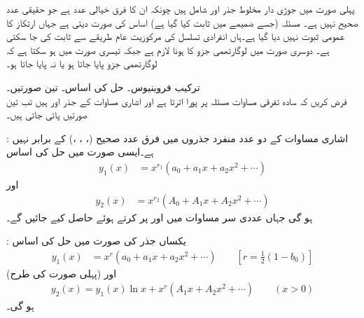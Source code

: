 پہلی صورت میں جوڑی دار مخلوط جذر  اور  شامل ہیں چونکہ ان کا فرق  خیالی عدد ہے جو حقیقی عدد صحیح نہیں ہے۔ مسئلہ  (جسے ضمیمے میں ثابت کیا گیا ہے) اساس کی صورت دیتی ہے جہاں ارتکاز کا عمومی ثبوت نہیں دیا گیا ہے۔ہاں انفرادی تسلسل کی مرکوزیت عام طریقے سے ثابت کی جا سکتی ہے۔  دوسری صورت میں لوگارتھمی جزو کا ہونا لازم ہے جبکہ تیسری صورت میں ہو سکتا ہے کہ لوگارتھمی جزو پایا جاتا ہو یا نہ پایا جاتا ہو۔

\quad ترکیب فروبنیوس۔ حل کی اساس۔ تین صورتیں۔\\
فرض کریں کہ سادہ تفرقی مساوات  مسئلہ  پر پورا اترتا ہے  اور اشاری مساوات  کے جذر  اور  ہیں تب تین صورتیں پائی جاتی ہیں۔


: اشاری مساوات کے دو عدد  منفرد جذروں میں فرق عدد صحیح (، ، ،) کے برابر نہیں ہے۔ایسی صورت میں حل کی اساس
\begin{align}\label{مساوات_طاقتی_فروبنیوس_حل_الف}
y_1(x)&=x^{r_1}(a_0+a_1x+a_2x^2+\cdots)
\end{align}
اور
\begin{align}\label{مساوات_طاقتی_فروبنیوس_حل_ب}
y_2(x)&=x^{r_2}(A_0+A_1x+A_2x^2+\cdots)
\end{align}
ہو گی جہاں عددی سر مساوات  میں  اور  پر کرتے ہوئے حاصل کیے جائیں گے۔

: یکساں جذر  کی صورت میں حل کی اساس
\begin{align}\label{مساوات_طاقتی_فروبنیوس_حل_پ}
y_1(x)&=x^{r}(a_0+a_1x+a_2x^2+\cdots) \quad \quad [r=\frac{1}{2}(1-b_0)]
\end{align}
(پہلی صورت کی طرح) اور
\begin{align}\label{مساوات_طاقتی_فروبنیوس_حل_ت}
y_2(x)=y_1(x)\ln x+x^{r}(A_1x+A_2x^2+\cdots) \quad \quad (x>0)
\end{align}
ہو گی۔

